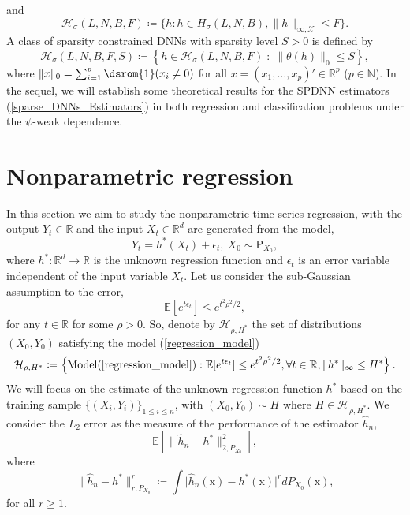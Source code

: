 \documentclass[10pt,twoside]{article}
\numberwithin{equation}{section}
\newcommand{\E}{\ensuremath{\mathbb{E}}}
\newcommand{\R}{\ensuremath{\mathbb{R}}}
\newcommand{\N}{\ensuremath{\mathbb{N}}}
\def \ind{\textrm{\dsrom{1}}}
\begin{document}
%
 and
\begin{equation}\label{DNNs_no_Constraint}
\mathcal{H}_{\sigma}(L, N, B, F) \coloneqq \big\{ h: h\in H_{\sigma}(L, N, B), \| h \|_{\infty, \mathcal{X}} \leq F \big\}. 
\end{equation}
%
A class of sparsity constrained DNNs with sparsity level $S > 0$  is defined by 
%
\begin{equation}\label{DNNs_Constraint}
\mathcal{H}_{\sigma}(L, N, B, F, S) \coloneqq \left\{h\in \mathcal{H}_{\sigma}(L, N, B, F) \; :  \; \| \theta(h) \|_0 \leq S 
  \right\},
\end{equation}
%
where $\| x \|_0 = \sum_{i=1}^p \ind(x_i \neq 0)$ for all $x=(x_1,\ldots,x_p)' \in \R^p$ ($p \in \N$).
%
In the sequel, we  will establish some theoretical results for the SPDNN estimators (\ref{sparse_DNNs_Estimators}) in both regression and classification problems under the $\psi$-weak dependence. 
%
%
\section{Nonparametric regression}\label{regression}
%
In this section we aim to study the nonparametric time series regression, with the output $ Y_t \in \R$ and the input $ X_t \in \R^d$ are generated from the model,
%
\begin{equation}\label{regression_model}
Y_t = h^ {*} (X_t) + \epsilon_t, ~ X_0 \sim  \text{P}_{X_0},
\end{equation}
%
where $ h^ {*}: \R^d  \rightarrow \R$  is the  unknown regression  function and $\epsilon_t$ is an error variable independent of the input variable  $X_t$.  Let us consider the  sub-Gaussian assumption to the error, 
%
\begin{equation}\label{sub_Gaussian}
\E [ e^ {t\epsilon_t}]  \leq e^ {t^2 \rho^2 / 2},
\end{equation}
%
for any $ t \in \R$ for some $\rho > 0$. 
So, denote by $ \mathcal{H}_{\rho, H^ {*}} $ the set of distributions $ (X_0, Y_0) $ satisfying the model (\ref{regression_model})
%
\begin{equation}\label{def_H_rho_H_star}
\mathcal{H}_{\rho, H^ {*}} \coloneqq \left\{ \text{Model}  (\ref{regression_model}): \E [ e^{t\epsilon_t}]  \leq e^{t^2\rho^2 / 2}, \forall t \in \R, \|h^ {*}\|_{\infty} \leq H^ {*} \right\}. 
\end{equation}
%
We will focus on the estimate of the unknown regression function $h^ {*} $ based on the  training sample $\{(X_i, Y_i)\}_{1 \leq i \leq n}$, with $ (X_0,Y_0) \sim  H $ where $ H \in \mathcal{H}_{\rho, H^ {*}} $.
%
We consider the $L_2$ error as the measure of the performance of the  estimator $ \widehat{h}_n$,
%
\[ \E \left[\| \widehat{h}_n - h^ {*}\|_{2, P_ {X_0}} ^2 \right],   \]
%
where
%
\[ \| \widehat{h}_n - h^ {*}\|_{r, P_{X_0}}^r  \coloneqq \displaystyle \int \vert  \widehat{h}_n (\text{x})- h^ {*} (\text{x}) \vert^r  d P_{X_0} ( \text{x}),   \]
%
for all $r \geq 1$.
\end{document}
